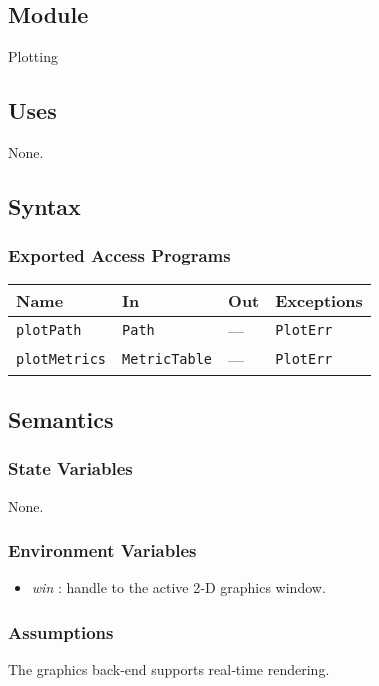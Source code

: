 \documentclass[12pt, titlepage]{article}
\begin{document}
\subsection{Module}
Plotting

\subsection{Uses}
None.

\subsection{Syntax}
\subsubsection{Exported Access Programs}
\begin{center}
\renewcommand{\arraystretch}{1.3}
\begin{tabular}{p{3.2cm} p{6cm} p{3cm} p{3cm}}
\toprule
\textbf{Name} & \textbf{In} & \textbf{Out} & \textbf{Exceptions}\\ \midrule
\texttt{plotPath}    & \texttt{Path} & --- & \texttt{PlotErr}\\
\texttt{plotMetrics} & \texttt{MetricTable} & --- & \texttt{PlotErr}\\
\bottomrule
\end{tabular}
\end{center}

\subsection{Semantics}
\subsubsection{State Variables}
None.

\subsubsection{Environment Variables}
\begin{itemize}
  \item \textit{win} : handle to the active 2‑D graphics window.
\end{itemize}

\subsubsection{Assumptions}
The graphics back‑end supports real‑time rendering.
\end{document}

